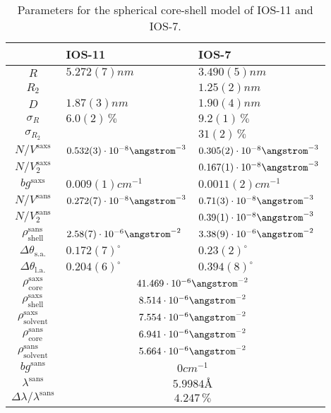 \documentclass[\main/dresen_thesis.tex]{subfiles}
\begin{document}
\begin{table}[tb]
  \centering
  \caption{\label{tab:looselyPackedNP:nanoparticle:sas}Parameters for the spherical core-shell model of IOS-11 and IOS-7.}
  \begin{tabular}{ c | l | l }
      & IOS-11 & IOS-7 \\
    \hline
    $R$
      & $5.272(7) \unit{nm}$
      & $3.490(5) \unit{nm}$\\
    $R_2$
      &
      & $1.25(2) \unit{nm}$\\
    $D$
      & $1.87(3) \unit{nm}$
      & $1.90(4) \unit{nm}$\\
    $\sigma_R$
      & $6.0(2) \,\%$
      & $9.2(1) \,\%$\\
    $\sigma_{R_2}$
      &
      & $31(2) \,\%$\\
    \hline
    $N/V^\mathrm{saxs}$
      & $0.532(3) \cdot 10^{-8} \angstrom^{-3}$
      & $0.305(2) \cdot 10^{-8} \angstrom^{-3}$\\
    $N/V_2^\mathrm{saxs}$
      &
      & $0.167(1) \cdot 10^{-8} \angstrom^{-3}$\\
    $bg^\mathrm{saxs}$
      & $0.009(1) \unit{cm}^{-1}$
      & $0.0011(2) \unit{cm}^{-1}$\\
    $N/V^\mathrm{sans}$
      & $0.272(7)\cdot 10^{-8} \angstrom^{-3}$
      & $0.71(3) \cdot 10^{-8} \angstrom^{-3}$\\
    $N/V_2^\mathrm{sans}$
      &
      & $0.39(1) \cdot 10^{-8} \angstrom^{-3}$\\
    $\rho_\mathrm{shell}^\mathrm{sans}$
      & $2.58(7) \cdot 10^{-6} \angstrom^{-2}$
      & $3.38(9) \cdot 10^{-6} \angstrom^{-2}$\\
    $\Delta \theta_\mathrm{s. a.}$
      & $0.172(7) ^\circ$
      & $0.23(2) ^\circ$\\
    $\Delta \theta_\mathrm{l. a.}$
      & $0.204(6) ^\circ$
      & $0.394(8) ^\circ$\\
    \hline
    $\rho_\mathrm{core}^\mathrm{saxs}$
      & \multicolumn{2}{c}{$41.469 \cdot 10^{-6} \angstrom^{-2}$}\\
    $\rho_\mathrm{shell}^\mathrm{saxs}$
      & \multicolumn{2}{c}{$8.514 \cdot 10^{-6} \angstrom^{-2}$}\\
    $\rho_\mathrm{solvent}^\mathrm{saxs}$
      & \multicolumn{2}{c}{$7.554 \cdot 10^{-6} \angstrom^{-2}$}\\
    $\rho_\mathrm{core}^\mathrm{sans}$
      & \multicolumn{2}{c}{$6.941 \cdot 10^{-6} \angstrom^{-2}$}\\
    $\rho_\mathrm{solvent}^\mathrm{sans}$
      & \multicolumn{2}{c}{$5.664 \cdot 10^{-6} \angstrom^{-2}$}\\
    $bg^\mathrm{sans}$
      & \multicolumn{2}{c}{$0 \unit{cm}^{-1}$}\\
      $\lambda^\mathrm{sans}$
        & \multicolumn{2}{c}{$5.9984 \unit{\angstrom}$}\\
      $\Delta \lambda / \lambda ^\mathrm{sans}$
        & \multicolumn{2}{c}{$4.247 \, \%$}\\
    \hline
  \end{tabular}
\end{table}
\end{document}
